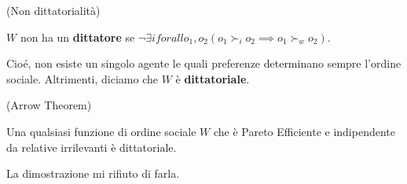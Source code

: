 \begin{definition}
    (Non dittatorialità)

    $W$ non ha un \textbf{dittatore} se $\lnot \exists i forall o_1, o_2 (o_1 \succ_i o_2 \implies o_1 \succ_w o_2)$.

    Cioé, non esiste un singolo agente le quali preferenze determinano 
    sempre l'ordine sociale. Altrimenti, diciamo che $W$ è \textbf{dittatoriale}.
\end{definition}

\begin{definition}
    (Arrow Theorem)

    Una qualsiasi funzione di ordine sociale $W$ che è Pareto Efficiente e indipendente 
    da relative irrilevanti è dittatoriale.

\end{definition}

La dimostrazione mi rifiuto di farla.


\newpage